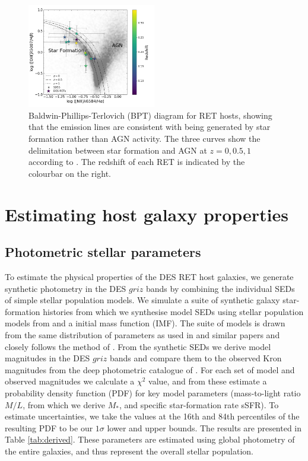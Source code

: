 \documentclass[fleqn,usenatbib,]{mnras}
\begin{document}
\begin{figure}
\includegraphics[width=0.5\textwidth]{figs/RET_BPT.png}
\caption{Baldwin-Phillips-Terlovich (BPT) diagram for RET hosts, showing that the emission lines are consistent with being generated by star formation rather than AGN activity. The three curves show the delimitation between star formation and AGN at $z =0, 0.5, 1$ according to \citet{Kewley2013}. The redshift of each RET is indicated by the colourbar on the right.
\label{fig:bpt}}
\end{figure}

\section{Estimating host galaxy properties}
\label{sec:measure}
\subsection{Photometric stellar parameters \label{subsec:sedfit}}
To estimate the physical properties of the DES RET host galaxies, we generate synthetic photometry in the DES $griz$ bands by combining the individual SEDs of simple stellar population models. We simulate a suite of synthetic galaxy star-formation histories from which we synthesise model SEDs using stellar population models from \citet{Bruzual2003}  and a \citet{Chabrier2003} initial mass function (IMF).  The suite of models is drawn from the same distribution of parameters as used in \citet{Kauffmann2003} and similar papers \citep[e.g.][]{Gallazzi2005,Gallazzi2009} and closely follows the method of \citet{Childress2013}. From the synthetic SEDs we derive model magnitudes in the DES $griz$ bands and compare them to the observed Kron magnitudes from the deep photometric catalogue of . For each set of model and observed magnitudes we calculate a $\chi^2$ value, and from these estimate a probability density function (PDF) for key model parameters (mass-to-light ratio $M/L$, from which we derive $M_*$, and specific star-formation rate sSFR). To estimate uncertainties, we take the values at the 16th and 84th percentiles of the resulting PDF to be our $1\sigma$ lower and upper bounds. The results are presented in Table \ref{tab:derived}. These parameters are estimated using global photometry of the entire galaxies, and thus represent the overall stellar population.
\end{document}
